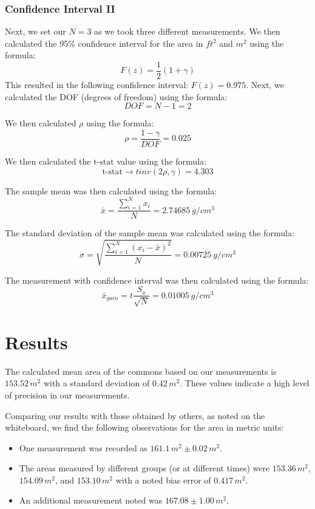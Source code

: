 \documentclass{article}
\begin{document}
\subsubsection{Confidence Interval II}

Next, we set our \( N = 3\) as we took three different measurements. We then calculated the 95\% confidence interval for the area in \(ft^2\) and \(m^2\) using the formula:
\[
F(z) = \frac{1}{2}(1 + \gamma)
\]
This resulted in the following confidence interval: \( F(z) = 0.975 \). Next, we calculated the DOF (degrees of freedom) using the formula:
\[
DOF = N - 1 = 2
\]


We then calculated \(\rho\) using the formula:
\[
\rho = \frac{1 - \gamma}{DOF} = 0.025
\]


We then calculated the \(\text{t-stat}\) value using the formula:
\[
\text{t-stat} \rightarrow tinv{(2\rho, \gamma)} = 4.303
\]


The sample mean was then calculated using the formula:
\[
\bar{x} = \frac{\sum_{i=1}^{N} x_i}{N} = 2.74685 \ g/cm^3
\]

The standard deviation of the sample mean was calculated using the formula:
\[
  \sigma = \sqrt{\frac{\sum_{i = 1}^{N}(x_i - \bar{x})^2}{N}} = 0.00725 \ g/cm^3
\]

The measurement with confidence interval was then calculated using the formula:
\[
  \bar{x}_{gain} = t\frac{S_x}{\sqrt{N}} = 0.01005 \ g/cm^3
\]





\section{Results}

The calculated mean area of the commons based on our measurements is \(153.52 \, m^2\) with a standard deviation of \(0.42 \, m^2\). These values indicate a high level of precision in our measurements.

Comparing our results with those obtained by others, as noted on the whiteboard, we find the following observations for the area in metric units:

\begin{itemize}
	\item One measurement was recorded as \(161.1 \, m^2 \pm 0.02 \, m^2\).
	\item The areas measured by different groups (or at different times) were \(153.36 \, m^2\), \(154.09 \, m^2\), and \(153.10 \, m^2\) with a noted bias error of \(0.417 \, m^2\).
	\item An additional measurement noted was \(167.08 \pm 1.00 \, m^2\).
\end{itemize}
\end{document}
